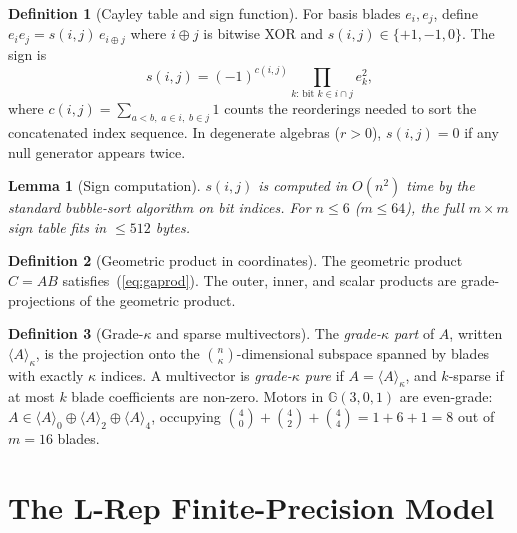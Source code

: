 \documentclass[11pt,a4paper]{article}
\theoremstyle{definition}
\newtheorem{definition}{Definition}[section]
\theoremstyle{plain}
\newtheorem{lemma}{Lemma}[section]
\theoremstyle{remark}
\newcommand{\GA}{\mathbb{G}}
\begin{document}
\begin{definition}[Cayley table and sign function]
\label{def:cayley}
For basis blades $e_i, e_j$, define
$e_i e_j = s(i,j)\, e_{i \oplus j}$
where $i \oplus j$ is bitwise XOR and $s(i,j) \in \{+1,-1,0\}$.
The sign is
\begin{equation}\label{eq:sign}
  s(i,j) = (-1)^{c(i,j)} \prod_{k:\,\text{bit } k \in i \cap j} e_k^2,
\end{equation}
where $c(i,j) = \sum_{a<b,\;a \in i,\;b \in j} 1$ counts the reorderings
needed to sort the concatenated index sequence.
In degenerate algebras ($r > 0$), $s(i,j) = 0$ if any null generator
appears twice.
\end{definition}

\begin{lemma}[Sign computation]
\label{lem:sign}
$s(i,j)$ is computed in $O(n^2)$ time by the standard bubble-sort
algorithm on bit indices.
For $n \le 6$ ($m \le 64$), the full $m \times m$ sign table fits in
$\le 512$ bytes.
\end{lemma}

\begin{definition}[Geometric product in coordinates]
The geometric product $C = AB$ satisfies~(\ref{eq:gaprod}).
The outer, inner, and scalar products are grade-projections of the
geometric product.
\end{definition}

\begin{definition}[Grade-$\kappa$ and sparse multivectors]
\label{def:grade}
The \emph{grade-$\kappa$ part} of $A$, written $\langle A \rangle_\kappa$,
is the projection onto the $\binom{n}{\kappa}$-dimensional subspace
spanned by blades with exactly $\kappa$ indices.
A multivector is \emph{grade-$\kappa$ pure} if $A = \langle A \rangle_\kappa$,
and $k$-sparse if at most $k$ blade coefficients are non-zero.
Motors in $\GA(3,0,1)$ are even-grade: $A \in \langle A \rangle_0 \oplus
\langle A \rangle_2 \oplus \langle A \rangle_4$, occupying
$\binom{4}{0} + \binom{4}{2} + \binom{4}{4} = 1+6+1 = 8$ out of $m=16$ blades.
\end{definition}

\section{The L-Rep Finite-Precision Model}
\label{sec:model}
\end{document}
